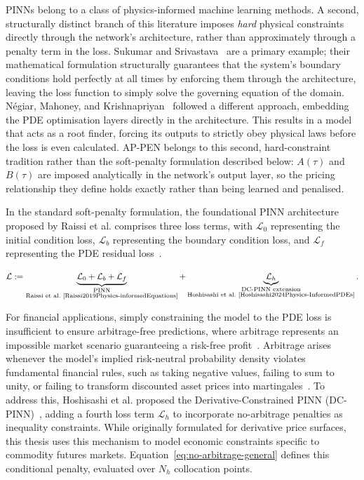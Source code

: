 \documentclass[sigconf, authorversion=true, nonacm=true]{acmart}
\begin{document}
PINNs belong to a class of physics-informed machine learning methods. A second, structurally distinct branch of this literature imposes \textit{hard} physical constraints directly through the network's architecture, rather than approximately through a penalty term in the loss. Sukumar and Srivastava~\cite{sukumar2022exact} are a primary example; their mathematical formulation structurally guarantees that the system's boundary conditions hold perfectly at all times by enforcing them through the architecture, leaving the loss function to simply solve the governing equation of the domain. Négiar, Mahoney, and Krishnapriyan~\cite{negiar2022learning} followed a different approach, embedding the PDE optimisation layers directly in the architecture. This results in a model that acts as a root finder, forcing its outputs to strictly obey physical laws before the loss is even calculated. AP-PEN belongs to this second, hard-constraint tradition rather than the soft-penalty formulation described below: $A(\tau)$ and $B(\tau)$ are imposed analytically in the network's output layer, so the pricing relationship they define holds exactly rather than being learned and penalised.

In the standard soft-penalty formulation, the foundational PINN architecture proposed by Raissi et al. comprises three loss terms, with $\mathcal{L}_0$ representing the initial condition loss, $\mathcal{L}_b$ representing the boundary condition loss, and $\mathcal{L}_f$ representing the PDE residual loss~\cite{Raissi2019Physics-informedEquations, Hoshisashi2024Whack-a-moleSurface}.

\begin{equation}
    \mathcal{L} := \underbrace{\mathcal{L}_0 + \mathcal{L}_b + \mathcal{L}_f}_{\substack{\text{PINN}\\ \text{Raissi et al.~\cite{Raissi2019Physics-informedEquations}}}}
    + \underbrace{\mathcal{L}_h}_{\substack{\text{DC-PINN extension}\\ \text{Hoshisashi et al.~\cite{Hoshisashi2024Physics-InformedPDEs}}}}.
\end{equation}

For financial applications, simply constraining the model to the PDE loss is insufficient to ensure arbitrage-free predictions, where arbitrage represents an impossible market scenario guaranteeing a risk-free profit~\cite{Hoshisashi2024Whack-a-moleSurface}. Arbitrage arises whenever the model's implied risk-neutral probability density violates fundamental financial rules, such as taking negative values, failing to sum to unity, or failing to transform discounted asset prices into martingales~\cite{Hoshisashi2024Physics-InformedPDEs}. To address this, Hoshisashi et al. proposed the Derivative-Constrained PINN (DC-PINN)~\cite{Hoshisashi2024Physics-InformedPDEs}, adding a fourth loss term $\mathcal{L}_h$ to incorporate no-arbitrage penalties as inequality constraints. While originally formulated for derivative price surfaces, this thesis uses this mechanism to model economic constraints specific to commodity futures markets. Equation~\ref{eq:no-arbitrage-general} defines this conditional penalty, evaluated over $N_h$ collocation points.
\end{document}
